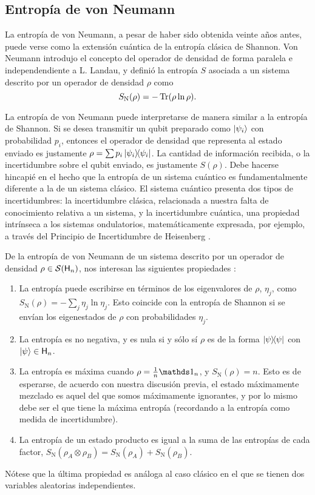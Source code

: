 \subsection{Entropía de von Neumann}

La entropía de von Neumann, a pesar de haber sido obtenida veinte años antes, puede verse como la extensión cuántica de la entropía clásica de Shannon. Von Neumann introdujo el concepto del operador de densidad de forma paralela e independendiente a L. Landau, y definió la entropía $S$ asociada a un sistema descrito por un operador de densidad $\rho$ como \cite{vonNeumann}
\begin{equation}\label{eq:VonNeumannEntropy}
    S_{\text{N}}(\rho)=-\Tr(\rho\ln{\rho}).
\end{equation}

La entropía de von Neumann puede interpretarse de manera similar a la entropía de Shannon. Si se desea transmitir un qubit preparado como $\ket{\psi_{i}}$ con probabilidad $p_{i}$, entonces el operador de densidad que representa al estado enviado es justamente $\rho=\sum p_{i}\dyad{\psi_{i}}$. La cantidad de información recibida, o la incertidumbre sobre el qubit enviado, es justamente $S(\rho)$. Debe hacerse hincapié en el hecho que la entropía de un sistema cuántico es fundamentalmente diferente a la de un sistema clásico. El sistema cuántico presenta dos tipos de incertidumbres: la incertidumbre clásica, relacionada a nuestra falta de conocimiento relativa a un sistema, y la incertidumbre cuántica, una propiedad intrínseca a los sistemas ondulatorios, matemáticamente expresada, por ejemplo, a través del Principio de Incertidumbre de Heisenberg \cite{Wilde}.


De la entropía de von Neumann de un sistema descrito por un operador de densidad $\rho\in\mathcal{S}({\sf H}_{n})$, nos interesan las siguientes propiedades \cite{Chuang}:
\begin{enumerate}
    \item La entropía puede escribirse en términos de los eigenvalores de $\rho$, $\eta_{j}$, como $S_{\text{N}}(\rho)=-\sum_{j}\eta_{j}\ln{\eta_{j}}$. Esto coincide con la entropía de Shannon si se envían los eigenestados de $\rho$ con probabilidades $\eta_{j}$.
    \item La entropía es no negativa, y es nula si y sólo sí $\rho$ es de la forma $\dyad{\psi}$ con $\ket{\psi}\in{\sf H}_{n}$.
    \item La entropía es máxima cuando $\rho=\frac{1}{n}\Id_{n}$, y $S_{\text{N}}(\rho)=n$. Esto es de esperarse, de acuerdo con nuestra discusión previa, el estado máximamente mezclado es aquel del que somos máximamente ignorantes, y por lo mismo debe ser el que tiene la máxima entropía (recordando a la entropía como medida de incertidumbre).
    \item La entropía de un estado producto es igual a la suma de las entropías de cada factor, $S_{\text{N}}(\rho_{A}\otimes\rho_{B})=S_{\text{N}}(\rho_{A})+S_{\text{N}}(\rho_{B})$.
\end{enumerate}
Nótese que la última propiedad es análoga al caso clásico en el que se tienen dos variables aleatorias independientes.